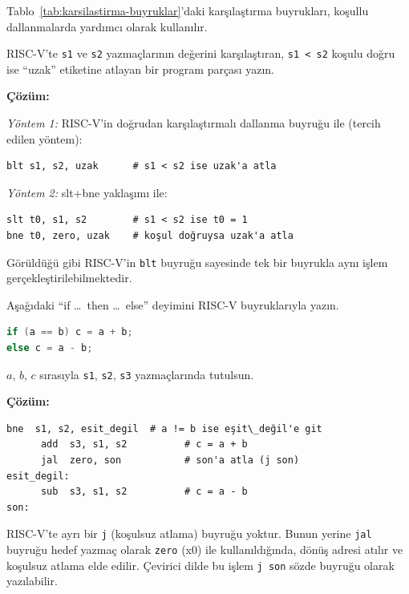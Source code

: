 Tablo~\ref{tab:karsilastirma-buyruklar}'daki karşılaştırma buyrukları, koşullu dallanmalarda yardımcı olarak kullanılır.

\begin{ornek}[3.14]
RISC-V'te \texttt{s1} ve \texttt{s2} yazmaçlarının değerini karşılaştıran, \texttt{s1 < s2} koşulu doğru ise ``uzak'' etiketine atlayan bir program parçası yazın.

\textbf{Çözüm:}

\textit{Yöntem 1:} RISC-V'in doğrudan karşılaştırmalı dallanma buyruğu ile (tercih edilen yöntem):
\begin{lstlisting}[style=riscv]
blt s1, s2, uzak      # s1 < s2 ise uzak'a atla
\end{lstlisting}

\textit{Yöntem 2:} slt+bne yaklaşımı ile:
\begin{lstlisting}[style=riscv]
slt t0, s1, s2        # s1 < s2 ise t0 = 1
bne t0, zero, uzak    # koşul doğruysa uzak'a atla
\end{lstlisting}

Görüldüğü gibi RISC-V'in \texttt{blt} buyruğu sayesinde tek bir buyrukla aynı işlem gerçekleştirilebilmektedir.
\end{ornek}

\begin{ornek}[3.15]
Aşağıdaki ``if \ldots\ then \ldots\ else'' deyimini RISC-V buyruklarıyla yazın.
\begin{lstlisting}[language=C]
if (a == b) c = a + b;
else c = a - b;
\end{lstlisting}
$a$, $b$, $c$ sırasıyla \texttt{s1}, \texttt{s2}, \texttt{s3} yazmaçlarında tutulsun.

\textbf{Çözüm:}
\begin{lstlisting}[style=riscv]
      bne  s1, s2, esit_degil  # a != b ise eşit\_değil'e git
      add  s3, s1, s2          # c = a + b
      jal  zero, son           # son'a atla (j son)
esit_degil:
      sub  s3, s1, s2          # c = a - b
son:
\end{lstlisting}

RISC-V'te ayrı bir \texttt{j} (koşulsuz atlama) buyruğu yoktur. Bunun yerine \texttt{jal} buyruğu hedef yazmaç olarak \texttt{zero} (x0) ile kullanıldığında, dönüş adresi atılır ve koşulsuz atlama elde edilir. Çevirici dilde bu işlem \texttt{j son} sözde buyruğu olarak yazılabilir.
\end{ornek}

